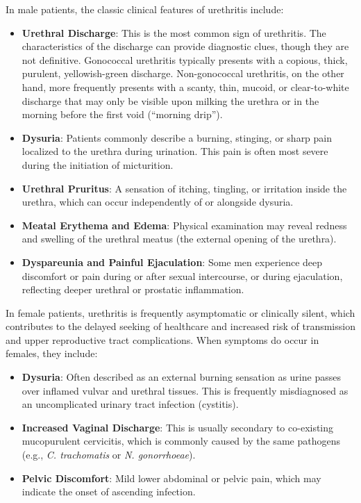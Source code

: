 In male patients, the classic clinical features of urethritis include:
\begin{itemize}
    \item \textbf{Urethral Discharge}: This is the most common sign of urethritis. The characteristics of the discharge can provide diagnostic clues, though they are not definitive. Gonococcal urethritis typically presents with a copious, thick, purulent, yellowish-green discharge. Non-gonococcal urethritis, on the other hand, more frequently presents with a scanty, thin, mucoid, or clear-to-white discharge that may only be visible upon milking the urethra or in the morning before the first void (``morning drip'').

    \item \textbf{Dysuria}: Patients commonly describe a burning, stinging, or sharp pain localized to the urethra during urination. This pain is often most severe during the initiation of micturition.

    \item \textbf{Urethral Pruritus}: A sensation of itching, tingling, or irritation inside the urethra, which can occur independently of or alongside dysuria.

    \item \textbf{Meatal Erythema and Edema}: Physical examination may reveal redness and swelling of the urethral meatus (the external opening of the urethra).

    \item \textbf{Dyspareunia and Painful Ejaculation}: Some men experience deep discomfort or pain during or after sexual intercourse, or during ejaculation, reflecting deeper urethral or prostatic inflammation.
\end{itemize}

In female patients, urethritis is frequently asymptomatic or clinically silent, which contributes to the delayed seeking of healthcare and increased risk of transmission and upper reproductive tract complications. When symptoms do occur in females, they include:
\begin{itemize}
    \item \textbf{Dysuria}: Often described as an external burning sensation as urine passes over inflamed vulvar and urethral tissues. This is frequently misdiagnosed as an uncomplicated urinary tract infection (cystitis).

    \item \textbf{Increased Vaginal Discharge}: This is usually secondary to co-existing mucopurulent cervicitis, which is commonly caused by the same pathogens (e.g., \textit{C. trachomatis} or \textit{N. gonorrhoeae}).

    \item \textbf{Pelvic Discomfort}: Mild lower abdominal or pelvic pain, which may indicate the onset of ascending infection.
\end{itemize}

